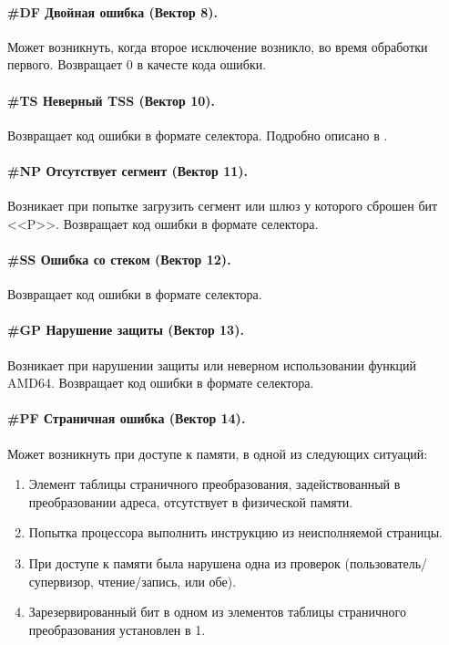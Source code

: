 \paragraph{\#DF Двойная ошибка (Вектор 8).}
Может возникнуть, когда второе исключение возникло, во время обработки
первого. Возвращает 0 в качесте кода ошибки.

\paragraph{\#TS Неверный TSS (Вектор 10).}
Возвращает код ошибки в формате селектора. Подробно описано в \cite[стр. 222]{amd_pm_v2}.

\paragraph{\#NP Отсутствует сегмент (Вектор 11).}
Возникает при попытке загрузить сегмент или шлюз у которого сброшен бит <<P>>.
Возвращает код ошибки в формате селектора.

\paragraph{\#SS Ошибка со стеком (Вектор 12).}
Возвращает код ошибки в формате селектора.

\paragraph{\#GP Нарушение защиты (Вектор 13).}
Возникает при нарушении защиты или неверном использовании функций AMD64.
Возвращает код ошибки в формате селектора.

\paragraph{\#PF Страничная ошибка (Вектор 14).}
Может возникнуть при доступе к памяти, в одной из следующих ситуаций:
\begin{enumerate}[1.]
\item Элемент таблицы страничного преобразования, задействованный в
преобразовании адреса, отсутствует в физической памяти.
\item Попытка процессора выполнить инструкцию из неисполняемой страницы.
\item При доступе к памяти была нарушена одна из проверок
(пользователь/супервизор, чтение/запись, или обе).
\item Зарезервированный бит в одном из элементов таблицы страничного
преобразования установлен в 1.
\end{enumerate}

